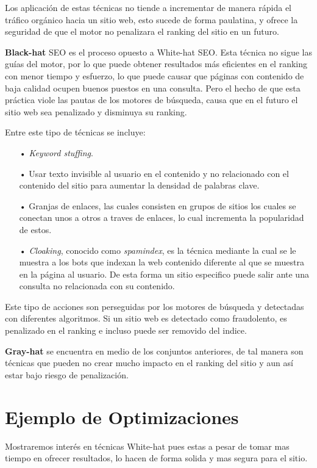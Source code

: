 \documentclass[12pt]{llncs}
\begin{document}
Los aplicación de estas técnicas no tiende a incrementar de manera rápida el tráfico orgánico hacia un sitio web, esto sucede de forma paulatina, y ofrece la seguridad de que el motor no penalizara el ranking del sitio en un futuro.

\textbf{Black-hat} SEO es el proceso opuesto a White-hat SEO. Esta técnica no sigue las guías del motor, por lo que puede obtener resultados más eficientes en el ranking con menor tiempo y esfuerzo, lo que puede causar que páginas con contenido de baja calidad ocupen buenos puestos en una consulta. Pero el hecho de que esta práctica viole las pautas de los motores de búsqueda, causa que en el futuro el sitio web sea penalizado y disminuya su ranking.

Entre este tipo de técnicas se incluye:

\begin{itemize}
    \item[•] \textit{Keyword stuffing}.
    \item[•] Usar texto invisible al usuario en el contenido y no relacionado con el contenido del sitio para aumentar la densidad de palabras clave.
    \item[•] Granjas de enlaces, las cuales consisten en grupos de sitios los cuales se conectan unos a otros a traves de enlaces, lo cual incrementa la popularidad de estos.
    \item[•] \textit{Cloaking}, conocido como \textit{spamindex}, es la técnica mediante la cual se le muestra a los bots que indexan la web contenido diferente al que se muestra en la página al usuario. De esta forma un sitio especifico puede salir ante una consulta no relacionada con su contenido.
\end{itemize}

Este tipo de acciones son perseguidas por los motores de búsqueda y detectadas con diferentes algoritmos. Si un sitio web es detectado como fraudolento, es penalizado en el ranking e incluso puede ser removido del indice.

\textbf{Gray-hat} se encuentra en medio de los conjuntos anteriores, de tal manera son técnicas que pueden no crear mucho impacto en el ranking del sitio y aun así estar bajo riesgo de penalización.

\section{Ejemplo de Optimizaciones}
Mostraremos interés en técnicas White-hat pues estas a pesar de tomar mas tiempo en ofrecer resultados, lo hacen de forma solida y mas segura para el sitio.
\end{document}
